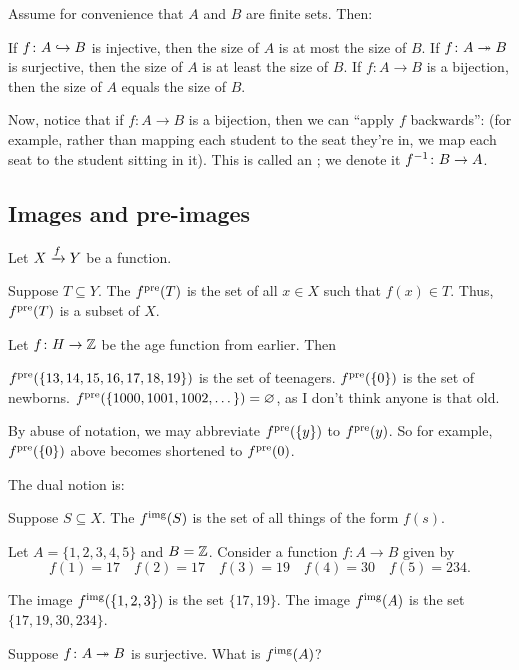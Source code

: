 \begin{remark}
	Assume for convenience that $A$ and $B$ are finite sets.
	Then:
	\begin{itemize}
		\ii If $f \colon A \hookrightarrow B$ is injective,
		then the size of $A$ is at most the size of $B$.
		\ii If $f \colon A \twoheadrightarrow B$ is surjective,
		then the size of $A$ is at least the size of $B$.
		\ii If $f \colon A \to B$ is a bijection,
		then the size of $A$ equals the size of $B$.
	\end{itemize}
\end{remark}

Now, notice that if $f \colon A \to B$ is a bijection,
then we can ``apply $f$ backwards'':
(for example, rather than mapping each student to the seat they're in,
we map each seat to the student sitting in it).
This is called an ;
we denote it $f^{-1} \colon B \to A$.

\subsection{Images and pre-images}
Let $X \xrightarrow{f} Y$ be a function.

\begin{definition}
	Suppose $T \subseteq Y$.
	The  $f^{\text{pre}}(T)$ is the set of all
	$x \in X$ such that $f(x) \in T$.
	Thus, $f^{\text{pre}}(T)$ is a subset of $X$.
\end{definition}
\begin{example}
	Let $f \colon H \to \mathbb Z$ be the age function from earlier.
	Then
	\begin{enumerate}[(a)]
		\ii $f^{\text{pre}}(\{13, 14, 15, 16, 17, 18, 19\})$ is the set of teenagers.
		\ii $f^{\text{pre}}(\{0\})$ is the set of newborns.
		\ii $f^{\text{pre}}(\{1000, 1001, 1002, \dots \}) = \varnothing$,
		as I don't think anyone is that old.
	\end{enumerate}
\end{example}

\begin{abuse}
	By abuse of notation, we may abbreviate $f^{\text{pre}}(\{y\})$ to $f^{\text{pre}}(y)$.
	So for example, $f^{\text{pre}}(\{0\})$ above becomes shortened to $f^{\text{pre}}(0)$.
\end{abuse}

The dual notion is:
\begin{definition}
	Suppose $S \subseteq X$.
	The  $f^{\text{img}}(S)$ is the set of
	all things of the form $f(s)$.
\end{definition}
\begin{example}
	Let $A = \{1,2,3,4,5\}$ and $B = \mathbb Z$.
	Consider a function $f \colon A \to B$ given by
	\[
		f(1) = 17 \quad
		f(2) = 17 \quad
		f(3) = 19 \quad
		f(4) = 30 \quad
		f(5) = 234.
	\]
	\begin{enumerate}[(a)]
		\ii The image $f^{\text{img}}(\{1,2,3\})$ is the set $\{17, 19\}$.
		\ii The image $f^{\text{img}}(A)$ is the set $\{17, 19, 30, 234\}$.
	\end{enumerate}
\end{example}
\begin{ques}
	Suppose $f \colon A \twoheadrightarrow B$ is surjective.
	What is $f^{\text{img}}(A)$?
\end{ques}

